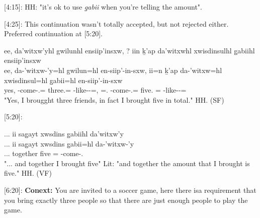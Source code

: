 [4:15]: HH: "it's ok to use \textit{g̱abii} when you're telling the amount".

[4:25]: This continuation wasn't totally accepted, but not rejected either. Preferred continuation at [5:20].

\begin{exe}
    \ex \glll ee, da'witxw'yhl gwilunhl ensiip'insxw, ? iin ḵ'ap da'witxwhl xwisdinsulhl g̱abiihl ensiip'insxw \\
            ee, da-'witxw-'y=hl gwilun=hl en-siip'-in-sxw, {} ii=n ḵ'ap da-'witxw=hl xwisdinsul=hl g̱abii=hl en-siip'-in-sxw \\
            yes, \Com{}-come-\Fsg{}.\Ii{}=\Cn{} three.\Hum{}=\Cn{} \Nmlz{}-like--\Antip{}=\Q{}, {} \Ccnj{}=\Fsg{}.\I{} \Verum{} \Com{}-come-\Fsg{}.\Ii{}=\Cn{} five.\Hum{} \Cnt{}=\Cn{} \Nmlz{}-like--\Antip{}=\Q{} \\
            \glt "Yes, I brougght three friends, in fact I brought five in total." \hfill HH.\ElicitationDate{} (SF)
\end{exe}

[5:20]:

\begin{exe}
    \ex \glll
    ... ii sag̱ayt xwsdins g̱abiihl da'witxw'y\\
    ... ii sag̱ayt xwsdins g̱abii=hl da-'witxw-'y\\
    ... \Ccnj{} together five \Cnt{}=\Cn{} \Com{}-come-\Fsg{}.\Ii{} \\
    \glt "... and together I brought five" Lit: "and together the amount that I brought is five." \hfill HH.\ElicitationDate{} (VF)
\end{exe}

[6:20]: \textbf{Conext: }You are invited to a soccer game, here there isa requirement that you bring exactly three people so that there are just enough people to play the game.


